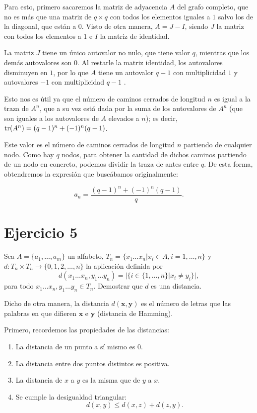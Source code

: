 \begin{enumerate}[label=\alph*)]
	Para esto, primero sacaremos la matriz de adyacencia $A$ del grafo completo, que no es más que una matriz de $q\times q$ con todos los elementos iguales a $1$ salvo los de la diagonal, que están a $0$. Visto de otra manera, $A = J-I$, siendo $J$ la matriz con todos los elementos a $1$ e $I$ la matriz de identidad.
	
	La matriz $J$ tiene un único autovalor no nulo, que tiene valor $q$, mientras que los demás autovalores son $0$. Al restarle la matriz identidad, los autovalores disminuyen en $1$, por lo que $A$ tiene un autovalor $q-1$ con multiplicidad $1$ y autovalores $-1$ con multiplicidad $q-1$ \cite{fox2009}.
	
	Esto nos es útil ya que el número de caminos cerrados de longitud $n$ es igual a la traza de $A^n$, que a su vez está dada por la suma de los autovalores de $A^n$ (que son iguales a los autovalores de $A$ elevados a $n$); es decir, $\operatorname{tr}(A^n) = (q-1)^n + (-1)^n(q-1)$.
	
	Este valor es el número de caminos cerrados de longitud $n$ partiendo de cualquier nodo. Como hay $q$ nodos, para obtener la cantidad de dichos caminos partiendo de un nodo en concreto, podemos dividir la traza de antes entre $q$. De esta forma, obtendremos la expresión que buscábamos originalmente:
	
	\[a_n = \frac{(q-1)^n + (-1)^n(q-1)}{q}.\]
\end{enumerate}
	
\section{Ejercicio 5}

\begin{formulationBox}
	Sea $A = \{a_1,\hdots,a_m\}$ un alfabeto, $T_n = \{x_1\hdots x_n|x_i\in A, i=1,\hdots,n\}$ y $d:T_n\times T_n\rightarrow\{0,1,2,\hdots,n\}$ la aplicación definida por
	\[d(x_1\hdots x_n, y_1\hdots y_n) = |\{i\in\{1,\hdots,n\}|x_i\neq y_i\}|,\]
	para todo $x_1\hdots x_n, y_1\hdots y_n\in T_n$. Demostrar que $d$ es una distancia.
\end{formulationBox}

Dicho de otra manera, la distancia $d(\textbf{x}, \textbf{y})$ es el número de letras que las palabras en que difieren $\textbf{x}$ e $\textbf{y}$ (distancia de Hamming).

Primero, recordemos las propiedades de las distancias:

\begin{enumerate}[label=\alph*)]
	\item La distancia de un punto a sí mismo es $0$.
	\item La distancia entre dos puntos distintos es positiva.
	\item La distancia de $x$ a $y$ es la misma que de $y$ a $x$.
	\item Se cumple la desigualdad triangular:
	\[d(x, y) \leq d(x, z) + d(z, y).\]
\end{enumerate}

